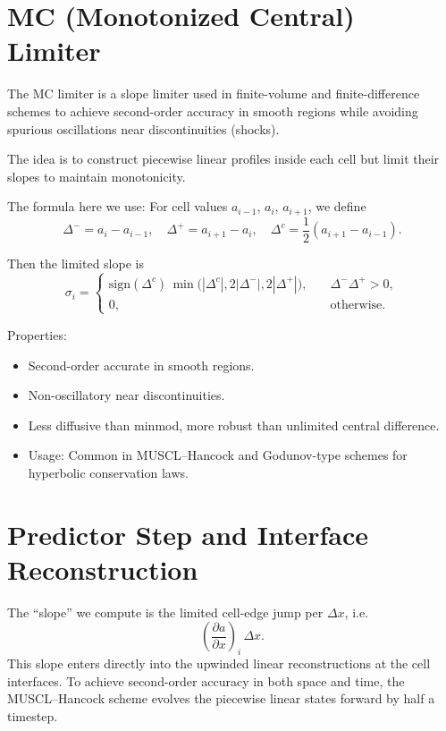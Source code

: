 \documentclass{article}
\begin{document}
\section{MC (Monotonized Central) Limiter}
The MC limiter is a slope limiter used in finite-volume and finite-difference schemes to achieve second-order accuracy in smooth regions while avoiding spurious oscillations near discontinuities (shocks).

The idea is to construct piecewise linear profiles inside each cell but limit their slopes to maintain monotonicity.

The formula here we use: For cell values $a_{i-1}$, $a_i$, $a_{i+1}$, we define
\begin{equation}
\Delta^- = a_i - a_{i-1}, \quad
\Delta^+ = a_{i+1} - a_i, \quad
\Delta^c = \frac{1}{2}(a_{i+1} - a_{i-1}).
\end{equation}

Then the limited slope is
\begin{equation}
\sigma_i =
\begin{cases}
\text{sign}(\Delta^c) \, \min\!\Big( |\Delta^c|, 2|\Delta^-|, 2|\Delta^+| \Big), &\quad \Delta^- \Delta^+ > 0, \\
0, &\quad \text{otherwise}.
\end{cases}	
\end{equation}

Properties:
\begin{itemize}
	\item Second-order accurate in smooth regions.
	\item Non-oscillatory near discontinuities.
	\item Less diffusive than minmod, more robust than unlimited central difference.
	\item Usage: Common in MUSCL--Hancock and Godunov-type schemes for hyperbolic conservation laws.
\end{itemize}

\section{Predictor Step and Interface Reconstruction}
The ``slope'' we compute is the limited cell-edge jump per $\Delta x$, i.e.
\begin{equation}
	\left(\frac{\partial a}{\partial x}\right)_i \, \Delta x.
\end{equation}
This slope enters directly into the upwinded linear reconstructions at the cell interfaces. To achieve second-order accuracy in both space and time, the MUSCL--Hancock scheme evolves the piecewise linear states forward by half a timestep. 
\end{document}
